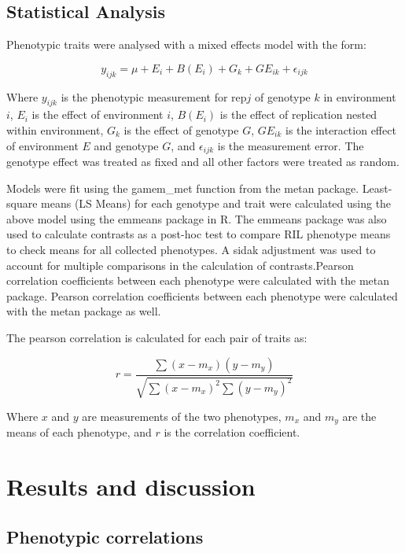 \documentclass[Agronomy,article,submit,moreauthors,pdftex]{mdpi}
\begin{document}
\hypertarget{statistical-analysis}{%
\subsection{Statistical Analysis}\label{statistical-analysis}}

Phenotypic traits were analysed with a mixed effects model with the
form:

\[y_{ijk} = \mu + E_i + B(E_i) + G_k + GE_{ik} + \epsilon_{ijk}\]

Where \(y_{ijk}\) is the phenotypic measurement for rep\(j\) of genotype
\(k\) in environment \(i\), \(E_i\) is the effect of environment \(i\),
\(B(E_i)\) is the effect of replication nested within environment,
\(G_k\) is the effect of genotype \(G\), \(GE_{ik}\) is the interaction
effect of environment \(E\) and genotype \(G\), and \(\epsilon_{ijk}\)
is the measurement error. The genotype effect was treated as fixed and
all other factors were treated as random.

Models were fit using the gamem\_met function from the metan
package\citep{olivotoMetanPackageMultienvironment2020}. Least-square
means (LS Means) for each genotype and trait were calculated using the
above model using the emmeans
package\citep{lenthEmmeansEstimatedMarginal2022} in R. The emmeans
package was also used to calculate contrasts as a post-hoc test to
compare RIL phenotype means to check means for all collected phenotypes.
A sidak adjustment was used to account for multiple comparisons in the
calculation of contrasts.Pearson correlation coefficients between each
phenotype were calculated with the metan package. Pearson correlation
coefficients between each phenotype were calculated with the metan
package as well.

The pearson correlation is calculated for each pair of traits as:

\[r = \frac{\sum{(x-m_x)(y-m_y)}}{\sqrt{\sum{(x-m_x)^2}\sum{(y-m_y)^2}}}\]

Where \(x\) and \(y\) are measurements of the two phenotypes, \(m_x\)
and \(m_y\) are the means of each phenotype, and \(r\) is the
correlation coefficient.

\hypertarget{results-and-discussion}{%
\section{Results and discussion}\label{results-and-discussion}}

\hypertarget{phenotypic-correlations}{%
\subsection{Phenotypic correlations}\label{phenotypic-correlations}}
\end{document}
